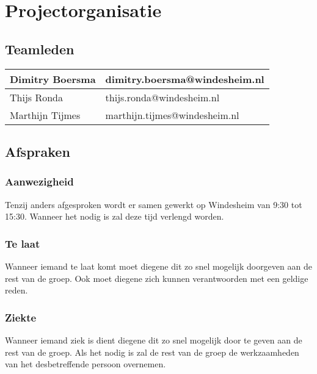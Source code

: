\section{Projectorganisatie}
\subsection{Teamleden}
\begin{tabularx}{\textwidth}{| X | X |}
	\hline
	Dimitry Boersma & dimitry.boersma@windesheim.nl \\ \hline
	Thijs Ronda & thijs.ronda@windesheim.nl \\ \hline
	Marthijn Tijmes & marthijn.tijmes@windesheim.nl \\
	\hline
\end{tabularx}

\subsection{Afspraken}
\subsubsection{Aanwezigheid} 
Tenzij anders afgesproken wordt er samen gewerkt op Windesheim van 9:30 tot 
15:30. Wanneer het nodig is zal deze tijd verlengd worden.

\subsubsection{Te laat}
Wanneer iemand te laat komt moet diegene dit zo snel mogelijk doorgeven aan 
de rest van de groep. Ook moet diegene zich kunnen verantwoorden met een 
geldige reden.


\subsubsection{Ziekte}
Wanneer iemand ziek is dient diegene dit zo snel mogelijk door te geven aan
de rest van de groep. Als het nodig is zal de rest van de groep de werkzaamheden
van het desbetreffende persoon overnemen. 


